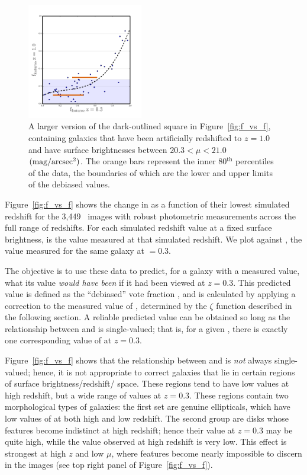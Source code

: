 \documentclass[a4paper,fleqn,usenatbib]{mnras}
\begin{document}
\begin{figure}
\centering
\includegraphics[width=0.45\textwidth]{figures/z1_mu20_subplot2.pdf}
\caption{A larger version of the dark-outlined square in Figure~\ref{fig:f_vs_f}, containing
\ferengi{} galaxies that have been artificially redshifted to $z=1.0$ and have
surface brightnesses between $20.3 < \mu < 21.0$ $\rm (mag/arcsec^2)$. The orange bars represent the inner
80$^\mathrm{th}$ percentiles of the data, the boundaries of which are the lower
and upper limits of the debiased values.}
\label{fig:f_vs_f_zoom}
\end{figure}

Figure~\ref{fig:f_vs_f} shows the change in \ffeatures{} as a function of their
lowest simulated redshift for the 3,449~\ferengi{} images with robust photometric
measurements across the full range of redshifts.  For each simulated redshift
value \zsim{} at a fixed surface brightness, \ffeaturesz{} is the value
measured at that simulated redshift. We plot \ffeaturesz{} against \ffeaturesrest, the
value measured for the same galaxy at \zsim$=0.3$. 
 
The objective is to use these data to predict, for a galaxy with a measured
\ffeaturesz{} value, what its \ffeatures{} value \emph{would have been} if it
had been viewed at $z=0.3$. This predicted value is defined as the ``debiased''
vote fraction \ffeaturesdebiased, and is calculated by applying a correction to
the measured value of \ffeatures, determined by the $\zeta$ function described
in the following section. A reliable predicted value can be obtained so long as
the relationship between \ffeaturesz{} and \ffeaturesrest{} is single-valued;
that is, for a given \ffeaturesz, there is exactly one corresponding value of
\ffeatures{} at $z=0.3$. 

Figure~\ref{fig:f_vs_f} shows that the relationship between \ffeaturesz{} and
\ffeaturesrest{} is \emph{not} always single-valued; hence, it is not
appropriate to correct galaxies that lie in certain regions of surface
brightness/redshift/\ffeatures{} space. These regions tend to have low
\ffeatures{} values at high redshift, but a wide range of values at $z=0.3$.
These regions contain two morphological types of galaxies: the first set are
genuine ellipticals, which have low values of \ffeatures{} at both high and low
redshift. The second group are disks whose features become indistinct at high
redshift; hence their \ffeatures{} value at $z=0.3$ may be quite high, while
the value observed at high redshift is very low. This effect is strongest at
high $z$ and low $\mu$, where features become nearly impossible to discern in
the images (see top right panel of Figure~\ref{fig:f_vs_f}).
\end{document}
